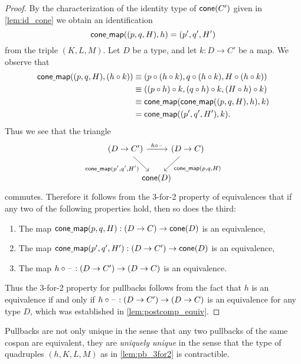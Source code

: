 \begin{proof}
By the characterization of the identity type of $\mathsf{cone}(C')$ given in \cref{lem:id_cone} we obtain an identification
\begin{equation*}
\mathsf{cone\underline{\ }{}map}((p,q,H),h)=(p',q',H')
\end{equation*}
from the triple $(K,L,M)$. 
Let $D$ be a type, and let $k:D\to C'$ be a map. We observe that
\begin{align*}
\mathsf{cone\underline{\ }{}map}((p,q,H),(h\circ k)) & \equiv (p\circ (h\circ k),q\circ (h\circ k),H\circ (h\circ k)) \\
& \equiv ((p\circ h)\circ k,(q\circ h)\circ k, (H\circ h)\circ k) \\
& \equiv \mathsf{cone\underline{\ }{}map}(\mathsf{cone\underline{\ }{}map}((p,q,H),h),k) \\
& = \mathsf{cone\underline{\ }{}map}((p',q',H'),k).
\end{align*}
Thus we see that the triangle 
\begin{equation*}
\begin{tikzcd}[column sep=-1em]
(D\to C') \arrow[rr,"{h\circ \blank}"] \arrow[dr,swap,"{\conemap(p',q',H')}"] & & (D\to C) \arrow[dl,"{\conemap(p,q,H)}"] \\
& \cone(D) & \phantom{(D\to C')}
\end{tikzcd}
\end{equation*}
commutes. Therefore it follows from the 3-for-2 property of equivalences that if any two of the following properties hold, then so does the third:
\begin{enumerate}
\item The map $\mathsf{cone\underline{\ }{}map}(p,q,H):(D\to C)\to \mathsf{cone}(D)$ is an equivalence,
\item The map $\mathsf{cone\underline{\ }{}map}(p',q',H'):(D\to C')\to \mathsf{cone}(D)$ is an equivalence,
\item The map $h\circ\mathord{\hspace{1pt}\text{--}\hspace{1pt}} : (D\to C')\to (D\to C)$ is an equivalence.
\end{enumerate}
Thus the 3-for-2 property for pullbacks follows from the fact that $h$ is an equivalence if and only if $h\circ\mathord{\hspace{1pt}\text{--}\hspace{1pt}} : (D\to C')\to (D\to C)$ is an equivalence for any type $D$, which was established in \cref{lem:postcomp_equiv}.
\end{proof}

Pullbacks are not only unique in the sense that any two pullbacks of the same cospan are equivalent, they are \emph{uniquely unique} in the sense that the type of quadruples $(h,K,L,M)$ as in \cref{lem:pb_3for2} is contractible.

